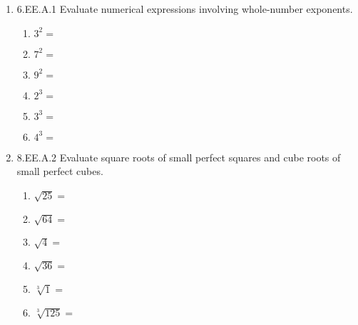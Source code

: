 \documentclass[12pt, twoside]{article}
\begin{document}
\begin{enumerate}[itemsep=0.5cm]
\item 6.EE.A.1 Evaluate numerical expressions involving whole-number exponents.
    \begin{multicols}{2}
    \begin{enumerate}[itemsep=0.5cm]
        \item $3^2=$
        \item $7^2=$
        \item $9^2=$
        \item $2^3=$
        \item $3^3=$
        \item $4^3=$
    \end{enumerate}
    \end{multicols}

\item 8.EE.A.2 Evaluate square roots of small perfect squares and cube roots of small perfect cubes.
    \begin{multicols}{2}
    \begin{enumerate}[itemsep=0.5cm]
        \item $\sqrt{25}=$
        \item $\sqrt{64}=$
        \item $\sqrt{4}=$
        \item $\sqrt{36}=$
        \item $\sqrt[3]{1}=$
        \item $\sqrt[3]{125}=$
    \end{enumerate}
    \end{multicols}

\end{enumerate}
\end{document}
